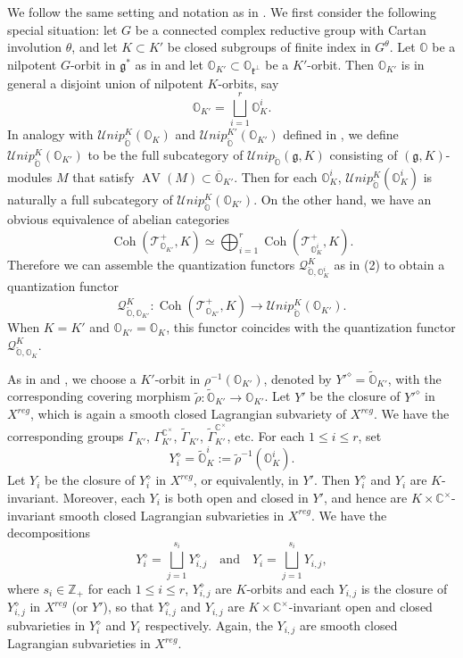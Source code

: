 \documentclass[11pt, a4paper]{amsart}
\newcommand{\C}{\mathbb{C}}
\newcommand{\g}{\mathfrak{g}}
\newcommand{\orb}{\mathbb{O}}
\newcommand{\orbk}{\orb_{K}}
\newcommand{\Z}{\mathbb{Z}}
\newcommand{\fk}{\mathfrak{k}}
\newcommand{\ckorb}{\check{\orb}}
\newcommand{\tGamma}{\widetilde{\Gamma}}
\DeclareMathOperator{\AV}{AV}
\DeclareMathOperator{\Coh}{Coh}
\newcommand{\cUnipOv}{\mathcal{U}nip_{\ckorb}}
\newcommand{\TT}{\mathscr{T}}
\newcommand{\quan}{\mathcal{Q}}
\newcommand{\cm}{\C^\times}
\theoremstyle{definition}
\numberwithin{equation}{section}
\begin{document}
We follow the same setting and notation as in . We first consider the following special situation: let $G$ be a connected complex reductive group with Cartan involution $\theta$, and let $K \subset K'$ be closed subgroups of finite index in $G^\theta$. Let $\orb$ be a nilpotent $G$-orbit in $\g^*$ as in  and let $\orb_{K'} \subset \orb_{\fk^\perp}$ be a $K'$-orbit. Then $\orb_{K'}$ is in general a disjoint union of nilpotent $K$-orbits, say 
	\[ \orb_{K'} = \bigsqcup_{i=1}^r \orb_{K}^i.\]
In analogy with $\cUnipOv^K(\orbk)$ and $\cUnipOv^{K'}(\orb_{K'})$ defined in , we define $\cUnipOv^K(\orb_{K'})$ to be the full subcategory of $\cUnipOv(\g,K)$ consisting of $(\g,K)$-modules $M$ that satisfy $\AV(M) \subset \overline{\orb}_{K'}$. Then for each $\orbk^i$, $\cUnipOv^K(\orbk^i)$ is naturally a full subcategory of $\cUnipOv^K(\orb_{K'})$. On the other hand, we have an obvious equivalence of abelian categories 
\[ \Coh(\TT^+_{\orb_{K'}}, K) \simeq \bigoplus_{i=1}^r \Coh(\TT^+_{\orb_{K}^i}, K). \]
Therefore we can assemble the quantization functors $\quan_{\ckorb, \orbk^i}^K$ as in  (2) to obtain a quantization functor
\begin{equation} \label{eq:quan_orbK'_K}
	\quan_{\ckorb, \orb_{K'}}^K: \Coh(\TT^+_{\orb_{K'}}, K) \to \cUnipOv^K(\orb_{K'}). 
\end{equation}
When $K=K'$ and $\orb_{K'} = \orb_{K}$, this functor coincides with the quantization functor $\quan_{\ckorb, \orbk}^K$.


As in  and , we choose a $K'$-orbit in $\rho^{-1}(\orb_{K'})$, denoted by $Y'^\diamond = \widetilde{\orb}_{K'}$, with the corresponding covering morphism $\tilde{\rho}: \widetilde{\orb}_{K'} \to \orb_{K'}$. Let $Y'$ be the closure of $Y'^\diamond$ in $X^{reg}$, which is again a smooth closed Lagrangian subvariety of $X^{reg}$. We have the corresponding groups $\Gamma_{K'}$, $\Gamma_{K'}^{\cm}$, $\tGamma_{K'}$, $\tGamma_{K'}^{\cm}$, etc. 
For each $1 \leqslant i \leqslant r$, set 
\[ Y_i^\diamond = \widetilde{\orb}_K^i := \tilde{\rho}^{-1}(\orb_{K}^i).\]
Let $Y_i$ be the closure of $Y_i^\diamond$ in $X^{reg}$, or equivalently, in $Y'$. Then $Y_i^\diamond$ and $Y_i$ are $K$-invariant. Moreover, each $Y_i$ is both open and closed in $Y'$, and hence are $K \times \cm$-invariant smooth closed Lagrangian subvarieties in $X^{reg}$. We have the decompositions
\[ 
	Y_i^\diamond = \bigsqcup_{j=1}^{s_i} Y_{i,j}^\diamond \quad \text{and} \quad Y_i = \bigsqcup_{j=1}^{s_i} Y_{i,j},
\]
where $s_i \in \Z_+$ for each $1 \leqslant i \leqslant r$, $Y_{i,j}^\diamond$ are $K$-orbits and each $Y_{i,j}$ is the closure of $Y_{i,j}^\diamond$ in $X^{reg}$ (or $Y'$), so that $Y_{i,j}^\diamond$ and $Y_{i,j}$ are $K \times \cm$-invariant open and closed subvarieties in $Y_i^\diamond$ and $Y_i$ respectively. Again, the $Y_{i,j}$ are smooth closed Lagrangian subvarieties in $X^{reg}$. 
\end{document}
